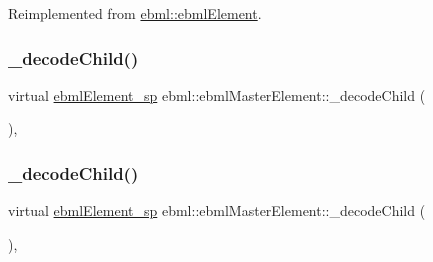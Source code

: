 Reimplemented from \mbox{\hyperlink{classebml_1_1ebmlElement_adf579591cece6b61d85cdb48861c3620}{ebml\+::ebml\+Element}}.

\mbox{\label{classebml_1_1ebmlMasterElement_a1486e31a30f3cfb709c66d9a06b053b9}} 
\subsubsection{\texorpdfstring{\+\_\+decode\+Child()}{\_decodeChild()}\hspace{0.1cm}{\footnotesize\ttfamily [1/2]}}
{\footnotesize\ttfamily virtual \mbox{\hyperlink{namespaceebml_adad533b7705a16bb360fe56380c5e7be}{ebml\+Element\+\_\+sp}} ebml\+::ebml\+Master\+Element\+::\+\_\+decode\+Child (\begin{DoxyParamCaption}\item[{const \mbox{\hyperlink{classebml_1_1parseString}{parse\+String}} \&}]{ }\end{DoxyParamCaption})\hspace{0.3cm}{\ttfamily [protected]}, {\ttfamily [virtual]}}

\mbox{\label{classebml_1_1ebmlMasterElement_a52c0643e9712686018ac3f3d305cff16}} 
\subsubsection{\texorpdfstring{\+\_\+decode\+Child()}{\_decodeChild()}\hspace{0.1cm}{\footnotesize\ttfamily [2/2]}}
{\footnotesize\ttfamily virtual \mbox{\hyperlink{namespaceebml_adad533b7705a16bb360fe56380c5e7be}{ebml\+Element\+\_\+sp}} ebml\+::ebml\+Master\+Element\+::\+\_\+decode\+Child (\begin{DoxyParamCaption}\item[{const \mbox{\hyperlink{classebml_1_1parseFile}{parse\+File}} \&}]{ }\end{DoxyParamCaption})\hspace{0.3cm}{\ttfamily [protected]}, {\ttfamily [virtual]}}

